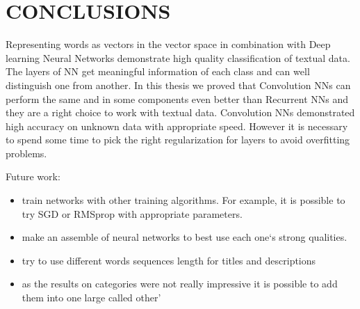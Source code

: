 \chapter*{CONCLUSIONS}						%


%

Representing words as vectors in the vector space in combination with Deep learning Neural Networks demonstrate high quality classification of textual data. The layers of NN get meaningful information of each class and can well distinguish one from another. In this thesis we proved that Convolution NNs can perform the same and in some components even better than Recurrent NNs and they are a right choice to work with textual data. Convolution NNs demonstrated high accuracy on unknown data with appropriate speed. However it is necessary to spend some time to pick the right regularization for layers to avoid overfitting problems.

Future work:
\begin{itemize}
	\item train networks with other training algorithms. For example, it is possible to try SGD or RMSprop with appropriate parameters. 
	\item make an assemble of neural networks to best use each one`s strong qualities.
	\item try to use different words sequences length for titles and descriptions
	\item as the results on categories were not really impressive it is possible to add them into one large called other'  
\end{itemize}